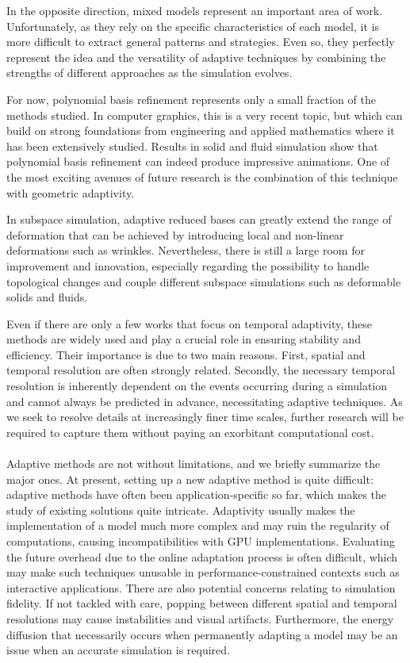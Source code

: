 In the opposite direction, mixed models represent an important area of work.
Unfortunately, as they rely on the specific characteristics of each model, it is more difficult to extract general patterns and strategies. 
Even so, they perfectly represent the idea and the versatility of adaptive techniques by combining the strengths of different approaches as the simulation evolves.

For now, polynomial basis refinement represents only a small fraction of the methods studied. In computer graphics, this is a very recent topic, but which can build on strong foundations from engineering and applied mathematics where it has been extensively studied. Results in solid and fluid simulation show that polynomial basis refinement can indeed produce impressive animations. One of the most exciting avenues of future research is the combination of this technique with geometric adaptivity.

In subspace simulation, adaptive reduced bases can greatly extend the range of deformation that can be achieved by introducing local and non-linear deformations such as wrinkles. Nevertheless, there is still a large room for improvement and innovation, especially regarding the possibility to handle topological changes and couple different subspace simulations such as deformable solids and fluids.

Even if there are only a few works that focus on temporal adaptivity, these methods are widely used and play a crucial role in ensuring stability and efficiency. Their importance is due to two main reasons. First, spatial and temporal resolution are often strongly related. Secondly, the necessary temporal resolution is inherently dependent on the events occurring during a simulation and cannot always be predicted in advance, necessitating adaptive techniques. As we seek to resolve details at increasingly finer time scales, further research will be required to capture them without paying an exorbitant computational cost.
\paragraph*{}
Adaptive methods are not without limitations, and we briefly summarize the major ones.
At present, setting up a new adaptive method is quite difficult: adaptive methods have often been application-specific so far, which makes the study of existing solutions quite intricate. Adaptivity usually makes the implementation of a model much more complex and may ruin the regularity of computations, causing incompatibilities with GPU implementations. Evaluating the future overhead due to the online adaptation process is often difficult, which may make such techniques unusable in performance-constrained contexts such as interactive applications.
There are also potential concerns relating to simulation fidelity. If not tackled with care, popping between different spatial and temporal resolutions may cause instabilities and visual artifacts. Furthermore, the energy diffusion that necessarily occurs when permanently adapting a model may be an issue when an accurate simulation is required.

